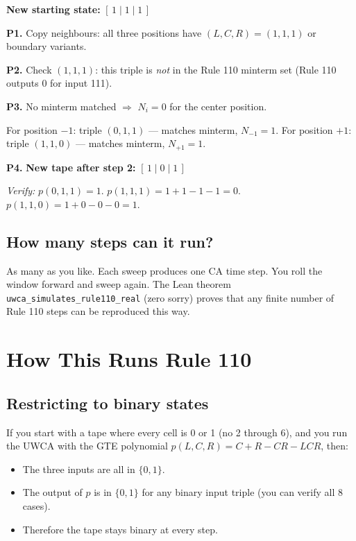 \documentclass[11pt,a4paper]{article}
\begin{document}
\textbf{New starting state:} $[\,1\;|\;1\;|\;1\,]$

\medskip
\noindent\textbf{P1.} Copy neighbours: all three positions have $(L,C,R) = (1,1,1)$
or boundary variants.

\medskip
\noindent\textbf{P2.} Check $(1,1,1)$: this triple is \emph{not} in the
Rule 110 minterm set (Rule 110 outputs 0 for input 111).

\medskip
\noindent\textbf{P3.} No minterm matched $\Rightarrow$ $N_i = 0$ for the
center position.

For position $-1$: triple $(0, 1, 1)$ — matches minterm, $N_{-1} = 1$.
For position $+1$: triple $(1, 1, 0)$ — matches minterm, $N_{+1} = 1$.

\noindent\textbf{P4.} \textbf{New tape after step 2:}
$[\,1\;|\;0\;|\;1\,]$

\textit{Verify:}
$p(0,1,1)=1$.\;\checkmark\quad
$p(1,1,1)=1+1-1-1=0$.\;\checkmark\quad
$p(1,1,0)=1+0-0-0=1$.\;\checkmark

\subsection{How many steps can it run?}

As many as you like.  Each sweep produces one CA time step.  You roll the
window forward and sweep again.  The Lean theorem
\texttt{uwca\_simulates\_rule110\_real} (zero sorry) proves that any finite
number of Rule 110 steps can be reproduced this way.

\section{How This Runs Rule 110}

\subsection{Restricting to binary states}

If you start with a tape where every cell is 0 or 1 (no 2 through 6), and
you run the UWCA with the GTE polynomial $p(L,C,R) = C + R - CR - LCR$,
then:

\begin{itemize}
  \item The three inputs are all in $\{0, 1\}$.
  \item The output of $p$ is in $\{0, 1\}$ for any binary input triple
        (you can verify all 8 cases).
  \item Therefore the tape stays binary at every step.
\end{itemize}
\end{document}
